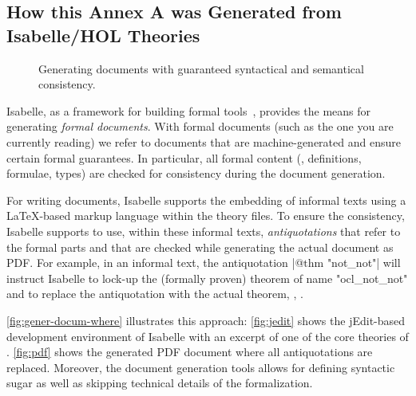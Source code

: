 
\subsection{How this Annex A was Generated from Isabelle/HOL Theories}
\begin{figure}[tb]
  \mbox{}\hfill
  \hfill%
  \hfill%
    \hfill\mbox{}
  \caption{Generating documents with guaranteed  syntactical and
    semantical consistency.}
  \label{fig:gener-docum-where}
\end{figure}
Isabelle, as a framework for building formal
tools~\cite{wenzel.ea:building:2007}, provides the means for
generating \emph{formal documents}.  With formal documents (such as
the one you are currently reading) we refer to documents that are
machine-generated and ensure certain formal guarantees. In particular,
all formal content (\eg, definitions, formulae, types) are checked for
consistency during the document generation.

For writing documents, Isabelle supports the embedding of informal
texts using a \LaTeX-based markup language within the theory files. To
ensure the consistency, Isabelle supports to use, within these
informal texts, \emph{antiquotations} that refer to the formal parts
and that are checked while generating the actual document as
PDF\@. For example, in an informal text, the antiquotation
\inlineisar|@{$\text{thm}$ "not_not"}| will instruct Isabelle to
lock-up the (formally proven) theorem of name \inlineisar"ocl_not_not"
and to replace the antiquotation with the actual theorem, \ie,
.

\autoref{fig:gener-docum-where}
illustrates this approach: \autoref{fig:jedit} shows the jEdit-based
development environment of Isabelle with an excerpt of one of the core
theories of \FOCL\@. \autoref{fig:pdf} shows the generated
PDF document where all antiquotations are replaced. Moreover,
the document generation tools allows for defining syntactic sugar as
well as skipping technical details of the formalization.

